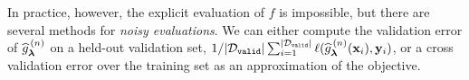 % 

In practice, however, the explicit evaluation of $f$ is impossible, but there are several methods for \emph{noisy evaluations}. We can either compute the validation error of $\widehat g_{{\boldsymbol \lambda}}^{\,(n)}$ on a held-out validation set,  $1/|\mathcal{D}_{\texttt{valid}}| \sum_{i=1}^{|\mathcal{D}_{\texttt{valid}}|} \ell(\widehat{g}^{\,(n)}_{{\boldsymbol \lambda}}({\bf x}_i),{\bf y}_i)$, or a cross validation error over the training set as an approximation of the  objective. %
